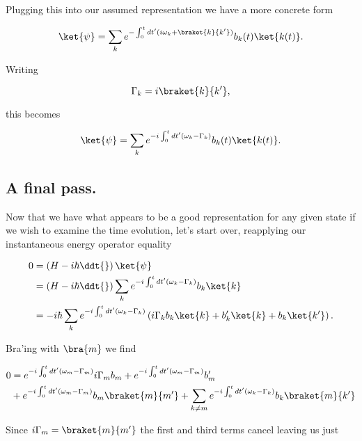 Plugging this into our assumed representation we have a more concrete form

\begin{equation}\label{eqn:oneMoreAdiabatic:70b}
\ket{\psi} 
= \sum_k e^{- \int_0^t dt' ( i \omega_k + \braket{k}{k'} ) } b_k(t) \ket{k(t)}.
\end{equation}

Writing 

\begin{equation}\label{eqn:oneMoreAdiabatic:180}
\Gamma_k = i \braket{k}{k'},
\end{equation}

this becomes

\begin{equation}\label{eqn:oneMoreAdiabatic:70c}
\ket{\psi} 
= \sum_k e^{- i\int_0^t dt' ( \omega_k - \Gamma_k ) } b_k(t) \ket{k(t)}.
\end{equation}

\subsection{A final pass.}

Now that we have what appears to be a good representation for any given state if we wish to examine the time evolution, let's start over, reapplying our instantaneous energy operator equality

\begin{align*}
0 
&=
\left(H - i \hbar \ddt{} \right)
\ket{\psi}  \\
&=
\left(H - i \hbar \ddt{} \right)
\sum_k e^{- i\int_0^t dt' ( \omega_k - \Gamma_k ) } b_k \ket{k} \\
&=
- i \hbar 
\sum_k 
e^{- i\int_0^t dt' ( \omega_k - \Gamma_k ) } 
\left(
i \Gamma_k
b_k \ket{k} 
+
b_k' \ket{k} 
+
b_k \ket{k'} 
\right).
\end{align*}

Bra'ing with $\bra{m}$ we find

\begin{align*}
0
&=
e^{- i\int_0^t dt' ( \omega_m - \Gamma_m ) } 
i \Gamma_m
b_m 
+
e^{- i\int_0^t dt' ( \omega_m - \Gamma_m ) } 
b_m' \\
&+
e^{- i\int_0^t dt' ( \omega_m - \Gamma_m ) } 
b_m \braket{m}{m'} 
+
\sum_{k \ne m}
e^{- i\int_0^t dt' ( \omega_k - \Gamma_k ) } 
b_k \braket{m}{k'} 
\end{align*}

Since $i \Gamma_m = \braket{m}{m'}$ the first and third terms cancel leaving us just

